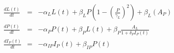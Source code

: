 

\begin{eqnarray}
  \frac{dL(t)}{dt} &=& -\alpha_{L}L(t) + \beta_{L}P\left(1-\left(\frac{P}{\gamma_{L}}\right)^{2}\right) + \beta_{L}(A_{P}) \\
  \frac{dP(t)}{dt} &=& -\alpha_{P}P(t) + \beta_{P}L(t) + \beta_{P}\frac{A_{L}}{1+\delta_{P}I_{P}(t)} \\
  \frac{dI_{P}(t)}{dt} &=& -\alpha_{IP}I_{P}(t) + \beta_{IP}P(t)
\end{eqnarray}
